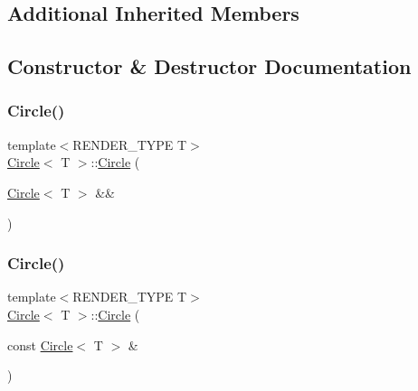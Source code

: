 \subsection*{Additional Inherited Members}


\subsection{Constructor \& Destructor Documentation}
\mbox{\label{classCircle_ad4ee8eadfd4201a937af204ac4e6ec37}} 
\subsubsection{\texorpdfstring{Circle()}{Circle()}\hspace{0.1cm}{\footnotesize\ttfamily [1/5]}}
{\footnotesize\ttfamily template$<$R\+E\+N\+D\+E\+R\+\_\+\+T\+Y\+PE T$>$ \\
\mbox{\hyperlink{classCircle}{Circle}}$<$ T $>$\+::\mbox{\hyperlink{classCircle}{Circle}} (\begin{DoxyParamCaption}\item[{\mbox{\hyperlink{classCircle}{Circle}}$<$ T $>$ \&\&}]{ }\end{DoxyParamCaption})\hspace{0.3cm}{\ttfamily [default]}}

\mbox{\label{classCircle_a163162aa8beaceb25ebd9a17966f4bd5}} 
\subsubsection{\texorpdfstring{Circle()}{Circle()}\hspace{0.1cm}{\footnotesize\ttfamily [2/5]}}
{\footnotesize\ttfamily template$<$R\+E\+N\+D\+E\+R\+\_\+\+T\+Y\+PE T$>$ \\
\mbox{\hyperlink{classCircle}{Circle}}$<$ T $>$\+::\mbox{\hyperlink{classCircle}{Circle}} (\begin{DoxyParamCaption}\item[{const \mbox{\hyperlink{classCircle}{Circle}}$<$ T $>$ \&}]{ }\end{DoxyParamCaption})\hspace{0.3cm}{\ttfamily [default]}}

\mbox{\label{classCircle_a0a298ea0e982a94a60091aeb2767f6e4}} 
